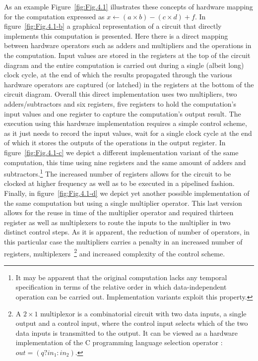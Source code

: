 As an example Figure~\ref{fig:Fig.4.1} illustrates these concepts of hardware mapping for the computation expressed as $x \gets (a \times b) - (c \times d) + f$. 
In figure~\ref{fig:Fig.4.1-b} a graphical representation of a circuit that directly implements this computation is presented. 
Here there is a direct mapping between hardware operators such as adders and multipliers and the operations in the computation. 
Input values are stored in the registers at the top of the circuit diagram and the entire computation is carried out during a single (albeit long) clock cycle, at the end of which the results propagated through the various hardware operators are captured (or latched) in the registers at the bottom of the circuit diagram. 
Overall this direct implementation uses two multipliers, two adders/subtractors and six registers, five registers to hold the computation's input values and one register to capture the computation's output result.
The execution using this hardware implementation  requires a simple control scheme, as it just needs to record the input values, wait for a single clock cycle at the end of which it stores the outputs of the operations in the output register. 
In figure~\ref{fig:Fig.4.1-c} we depict a different implementation variant of the same computation, this time using nine registers and the same amount of adders and subtractors.\footnote{It may be apparent that the original computation lacks any temporal specification in terms of the relative order in which data-independent operation can be carried out. Implementation variants exploit this property.} 
The increased number of registers allows for the circuit to be clocked at higher frequency as well as to be executed in a pipelined fashion. 
Finally, in figure~\ref{fig:Fig.4.1-d} we depict yet another possible implementation of the same computation but using a single multiplier operator. 
This last version allows for the reuse in time of the multiplier operator and required thirteen register as well as multiplexers to route the inputs to the multiplier in two distinct control steps. 
As it is apparent, the reduction of number of operators, in this particular case the multipliers carries a penalty in an increased number of registers, multiplexers~\footnote{A $2\times1$ multiplexor is a combinatorial circuit with two data inputs, a single output and a control input, where the control input selects which of the two data inputs is transmitted to the output. 
  It can be viewed as a hardware implementation of the C programming language selection operator : 
  $\textit{out} = (q ? 
    \textit{in}_1 : 
    \textit{in}_2)$.} 
and increased complexity of the control scheme.\\

